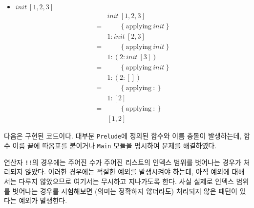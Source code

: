 \begin{itemize}
\item $init~[1,2,3]$
  \begin{align*}
      & init~[1,2,3] \\
    = & \qquad \{~ \text{applying}~init ~\} \\
      & 1:init~[2,3] \\
    = & \qquad \{~ \text{applying}~init ~\} \\
      & 1:(2:init~[3]) \\
    = & \qquad \{~ \text{applying}~init ~\} \\
      & 1:(2:[]) \\
    = & \qquad \{~ \text{applying}~: ~\} \\
      & 1:[2] \\
    = & \qquad \{~ \text{applying}~: ~\} \\
      & [1,2]
  \end{align*}
\end{itemize}

다음은 구현된 코드이다. 대부분 \texttt{Prelude}에 정의된 함수와 이름 충돌이
발생하는데, 함수 이름 끝에 따옴표를 붙이거나 \texttt{Main} 모듈을 명시하여
문제를 해결하였다.

연산자 \texttt{!!}의 경우에는 주어진 수가 주어진 리스트의 인덱스 범위를
벗어나는 경우가 처리되지 않았다. 이러한 경우에는 적절한 예외를 발생시켜야
하는데, 아직 예외에 대해서는 다루지 않았으므로 여기서는 무시하고 지나가도록
한다. 사실 실제로 인덱스 범위를 벗어나는 경우를 시험해보면 (의미는 정확하지
않더라도) 처리되지 않은 패턴이 있다는 예외가 발생한다.



